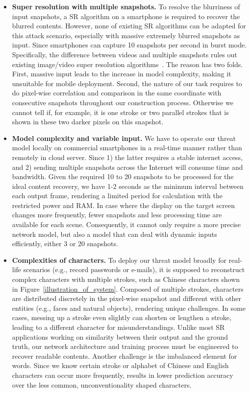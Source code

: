 \begin{itemize}[leftmargin=*]
  \item \textbf{Super resolution with multiple snapshots.} To resolve the blurriness of input snapshots, a SR algorithm on a smartphone is required to recover the blurred contents. However, none of existing SR algorithms can be adapted for this attack scenario, especially with massive extremely blurred snapshots as input. Since smartphones can capture 10 snapshots per second in burst mode. Specifically, the difference between videos and multiple snapshots rules out existing image/video super resolution algorithms~\cite{lucas2019generative,kappeler2016video}. The reason has two folds. First, massive input leads to the increase in model complexity, making it unsuitable for mobile deployment. Second, the nature of our task requires to do pixel-wise correlation and comparison in the same coordinate with consecutive snapshots throughout our construction process. Otherwise we cannot tell if, for example, it is one stroke or two parallel strokes that is shown in these two darker pixels on this snapshot.
  \item \textbf{Model complexity and variable input.} We have to operate our threat model locally on commercial smartphones in a real-time manner rather than remotely in cloud server. Since 1) the latter requires a stable internet access, and 2) sending multiple snapshots across the Internet will consume time and bandwidth. Given the required 10 to 20 snapshots to be processed for the ideal content recovery, we have 1-2 seconds as the minimum interval between each output frame, rendering a limited period for calculation with the restricted power and RAM. In case where the display on the target screen changes more frequently, fewer snapshots and less processing time are available for each scene. Consequently, it cannot only require a more precise network model, but also a model that can deal with dynamic inputs efficiently, either 3 or 20 snapshots.
  \item \textbf{Complexities of characters.} To deploy our threat model broadly for real-life scenarios (e.g., record passwords or e-mails), it is supposed to reconstruct complex characters with multiple strokes, such as Chinese characters shown in Figure~\ref{illustration_of_system}. Composed of multiple strokes, characters are distributed discretely in the pixel-wise snapshot and different with other entities (e.g., faces and natural objects), rendering unique challenges. In some cases, messing up a stroke even slightly can shorten or lengthen a stroke, leading to a different character for misunderstandings. Unlike most SR applications working on similarity between their output and the ground truth, our network architecture and training process must be engineered to recover readable contents. Another challenge is the imbalanced element for words. Since we know certain stroke or alphabet of Chinese and English characters can occur more frequently, results in lower prediction accuracy over the less common, unconventionality shaped characters.
\end{itemize}

